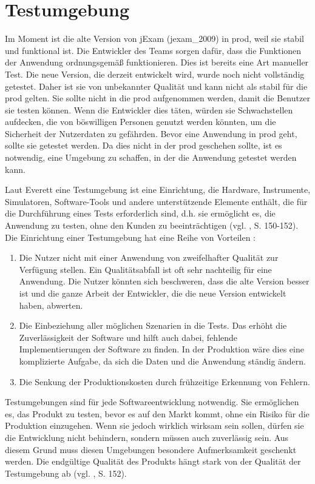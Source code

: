 \section{Testumgebung}

Im Moment ist die alte Version von jExam (\gls{jexam_2009})
in \gls{prod}, weil sie stabil und funktional ist.
Die Entwickler des Teams sorgen dafür, dass die
Funktionen der Anwendung ordnungsgemäß funktionieren.
Dies ist bereits eine Art manueller Test. Die neue
Version, die derzeit entwickelt wird, wurde noch nicht
vollständig getestet. Daher ist sie von unbekannter
Qualität und kann nicht als stabil für die \gls{prod}
gelten. Sie sollte nicht in die \gls{prod} aufgenommen
werden, damit die Benutzer sie testen können.  Wenn
die Entwickler dies täten, würden sie Schwachstellen
aufdecken, die von böswilligen Personen genutzt werden
könnten, um die Sicherheit der Nutzerdaten zu
gefährden. Bevor eine Anwendung in \gls{prod} geht,
sollte sie getestet werden. Da dies nicht in der
\gls{prod} geschehen sollte, ist es notwendig, eine
Umgebung zu schaffen, in der die Anwendung getestet
werden kann.


Laut Everett eine Testumgebung ist eine Einrichtung,
die Hardware, Instrumente, Simulatoren, Software-Tools
und andere unterstützende Elemente enthält, die für
die Durchführung eines Tests erforderlich sind,
d.h. sie ermöglicht es, die Anwendung zu testen, ohne
den Kunden zu beeinträchtigen (vgl. \cite{shultz2011software}, S. 150-152).
Die Einrichtung einer Testumgebung hat eine Reihe von Vorteilen :

\noindent
\begin{enumerate}
    \item Die Nutzer nicht mit einer Anwendung von
    zweifelhafter Qualität zur Verf\"ugung stellen. Ein
    Qualitätsabfall ist oft sehr nachteilig für eine
    Anwendung. Die Nutzer könnten sich beschweren,
    dass die alte Version besser ist und die ganze
    Arbeit der Entwickler, die die neue Version
    entwickelt haben, abwerten.

    \item Die Einbeziehung aller möglichen Szenarien in die
    Tests. Das erhöht die Zuverlässigkeit der Software und
    hilft auch dabei, fehlende  Implementierungen der Software zu finden. In der
    Produktion wäre dies eine komplizierte Aufgabe, da
    sich die Daten und die Anwendung ständig ändern.

    \item Die Senkung der Produktionskosten durch
    frühzeitige Erkennung von Fehlern.

\end{enumerate}

Testumgebungen sind für jede Softwareentwicklung
notwendig. Sie ermöglichen es, das Produkt zu testen,
bevor es auf den Markt kommt, ohne ein Risiko für die
Produktion einzugehen. Wenn sie jedoch wirklich
wirksam sein sollen, dürfen sie die Entwicklung nicht
behindern, sondern müssen auch zuverlässig sein. Aus
diesem Grund muss diesen Umgebungen besondere
Aufmerksamkeit geschenkt werden. Die endgültige
Qualität des Produkts hängt stark von der Qualität der
Testumgebung ab (vgl. \cite{shultz2011software}, S. 152).


